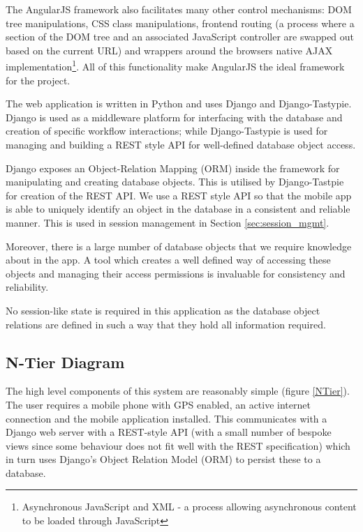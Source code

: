 The AngularJS framework also facilitates many other control
mechanisms: DOM tree manipulations, CSS class manipulations, frontend
routing (a process where a section of the DOM tree and an associated
JavaScript controller are swapped out based on the current URL) and
wrappers around the browsers native AJAX implementation\footnote{Asynchronous
JavaScript and XML - a process allowing asynchronous content to be
loaded through JavaScript}. All of this
functionality make AngularJS the ideal framework for the project. 

The web application is written in Python and uses Django\cite{django}
and Django-Tastypie\cite{tastypie}. Django is used as a middleware
platform for interfacing with the database and creation of specific
workflow interactions; while Django-Tastypie is used for managing and
building a REST style API for well-defined database object access.

Django exposes an Object-Relation Mapping (ORM) inside the framework
for manipulating and creating database objects. This is utilised by
Django-Tastpie for creation of the REST API. We use a REST style API
so that the mobile app is able to uniquely identify an object in the
database in a consistent and reliable manner. This is used in 
session management in Section \ref{sec:session_mgmt}.

Moreover, there is a large number of database objects that we require
knowledge about in the app. A tool which creates a well defined way of
accessing these objects and managing their access permissions is
invaluable for consistency and reliability.

No session-like state is required in this application as the database
object relations are defined in such a way that they hold all
information required. 

\subsection{N-Tier Diagram}
The high level components of this system are reasonably simple (figure
\ref{NTier}). The
user requires a mobile phone with GPS enabled, an active internet
connection and the mobile application installed. This communicates
with a Django web server with a REST-style API (with a small number of
bespoke views since some behaviour does not fit well with the REST
specification) which in turn uses Django's Object Relation Model (ORM)
to persist these to a database.


